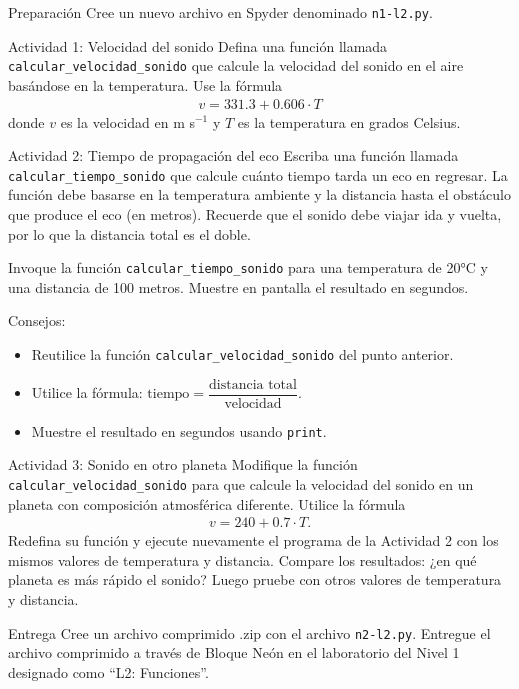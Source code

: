 \documentclass{ip-lab}
\begin{document}
\maketitle

\begin{sectionbox}{Preparación}
    Cree un nuevo archivo en Spyder denominado \texttt{n1-l2.py}.
\end{sectionbox}

\begin{sectionbox}{Actividad 1: Velocidad del sonido}
Defina una función llamada \texttt{calcular\_velocidad\_sonido} que calcule la velocidad del sonido en el aire basándose en la temperatura. Use la fórmula
\begin{gather*}
    v = 331.3 + 0.606 \cdot T
\end{gather*}
donde $v$ es la velocidad en m s$^{-1}$ y $T$ es la temperatura en grados Celsius.
\end{sectionbox}

\begin{sectionbox}{Actividad 2: Tiempo de propagación del eco}
Escriba una función llamada \texttt{calcular\_tiempo\_sonido} que calcule cuánto tiempo tarda un eco en regresar. La función debe basarse en la temperatura ambiente y la distancia hasta el obstáculo que produce el eco (en metros). Recuerde que el sonido debe viajar ida y vuelta, por lo que la distancia total es el doble. 

Invoque la función \texttt{calcular\_tiempo\_sonido} para una temperatura de 20°C y una distancia de 100 metros. Muestre en pantalla el resultado en segundos.

\pagebreak

Consejos:
\begin{itemize}
    \item Reutilice la función \texttt{calcular\_velocidad\_sonido} del punto anterior.
    \item Utilice la fórmula: $\text{tiempo} = \dfrac{\text{distancia total}}{\text{velocidad}}$.
    \item Muestre el resultado en segundos usando \texttt{print}.
\end{itemize}
\end{sectionbox}

\begin{sectionbox}{Actividad 3: Sonido en otro planeta}
Modifique la función \texttt{calcular\_velocidad\_sonido} para que calcule la velocidad del sonido en un planeta con composición atmosférica diferente. Utilice la fórmula
\begin{gather*}
    v = 240 + 0.7 \cdot T.
\end{gather*}
Redefina su función y ejecute nuevamente el programa de la Actividad 2 con los mismos valores de temperatura y distancia. Compare los resultados: ¿en qué planeta es más rápido el sonido? Luego pruebe con otros valores de temperatura y distancia. 
\end{sectionbox}

\begin{sectionbox}{Entrega}
Cree un archivo comprimido .zip con el archivo \texttt{n2-l2.py}. Entregue el archivo comprimido a través de Bloque Neón en el laboratorio del Nivel 1 designado como ``L2: Funciones''.
\end{sectionbox}
\end{document}
